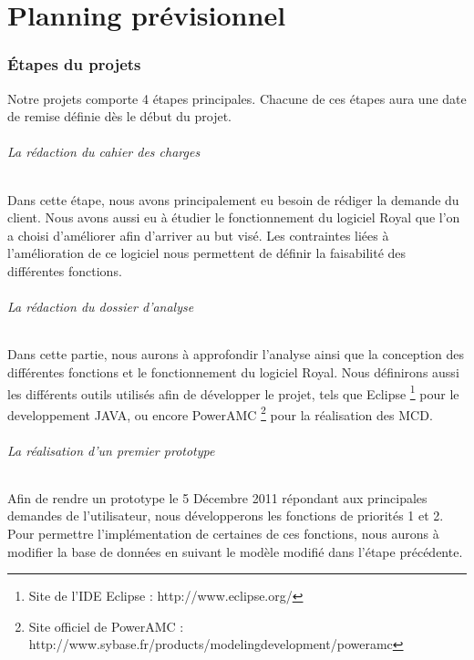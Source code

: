 \part{Planning prévisionnel}

\section{Étapes du projets}

Notre projets comporte 4 étapes principales. Chacune de ces étapes aura une date de remise définie dès le début du projet. 

\paragraph{La rédaction du cahier des charges}

Dans cette étape, nous avons principalement eu besoin de rédiger la demande du client. 
Nous avons aussi eu à étudier le fonctionnement du logiciel Royal que l'on a choisi d'améliorer afin d'arriver au but visé.
Les contraintes liées à l'amélioration de ce logiciel nous permettent de définir la faisabilité des différentes fonctions. 

\paragraph{La rédaction du dossier d'analyse}

Dans cette partie, nous aurons à approfondir l'analyse ainsi que la conception des différentes fonctions et le fonctionnement du logiciel Royal. 
Nous définirons aussi les différents outils utilisés afin de développer le projet, tels que 
Eclipse \footnote{Site de l'IDE Eclipse : http://www.eclipse.org/} 
pour le developpement JAVA, ou encore 
PowerAMC \footnote{Site officiel de PowerAMC : http://www.sybase.fr/products/modelingdevelopment/poweramc}
pour la réalisation des MCD.

\paragraph{La réalisation d'un premier prototype}

Afin de rendre un prototype le 5 Décembre 2011 répondant aux principales demandes de l'utilisateur, nous développerons les fonctions de priorités 1 et 2.
Pour permettre l'implémentation de certaines de ces fonctions, nous aurons à modifier la base de données en suivant le modèle modifié dans l'étape précédente.  

